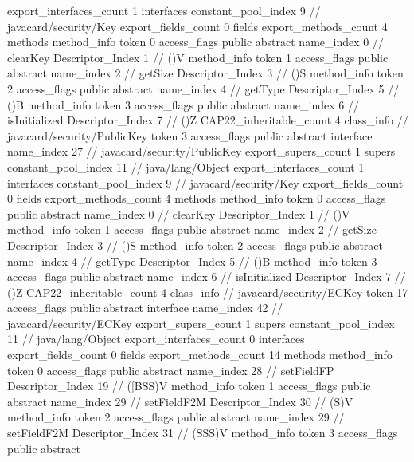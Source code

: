 {{{{			}
			export_interfaces_count	1
			interfaces {
				constant_pool_index	9		// javacard/security/Key
			}
			export_fields_count	0
			fields {
			}
			export_methods_count	4
			methods {
				method_info {
					token	0
					access_flags	public abstract
					name_index	0		// clearKey
					Descriptor_Index	1		// ()V
				}
				method_info {
					token	1
					access_flags	public abstract
					name_index	2		// getSize
					Descriptor_Index	3		// ()S
				}
				method_info {
					token	2
					access_flags	public abstract
					name_index	4		// getType
					Descriptor_Index	5		// ()B
				}
				method_info {
					token	3
					access_flags	public abstract
					name_index	6		// isInitialized
					Descriptor_Index	7		// ()Z
				}
			}
			CAP22_inheritable_count	4
		}
		class_info {		// javacard/security/PublicKey
			token	3
			access_flags	public abstract interface
			name_index	27		// javacard/security/PublicKey
			export_supers_count	1
			supers {
				constant_pool_index	11		// java/lang/Object
			}
			export_interfaces_count	1
			interfaces {
				constant_pool_index	9		// javacard/security/Key
			}
			export_fields_count	0
			fields {
			}
			export_methods_count	4
			methods {
				method_info {
					token	0
					access_flags	public abstract
					name_index	0		// clearKey
					Descriptor_Index	1		// ()V
				}
				method_info {
					token	1
					access_flags	public abstract
					name_index	2		// getSize
					Descriptor_Index	3		// ()S
				}
				method_info {
					token	2
					access_flags	public abstract
					name_index	4		// getType
					Descriptor_Index	5		// ()B
				}
				method_info {
					token	3
					access_flags	public abstract
					name_index	6		// isInitialized
					Descriptor_Index	7		// ()Z
				}
			}
			CAP22_inheritable_count	4
		}
		class_info {		// javacard/security/ECKey
			token	17
			access_flags	public abstract interface
			name_index	42		// javacard/security/ECKey
			export_supers_count	1
			supers {
				constant_pool_index	11		// java/lang/Object
			}
			export_interfaces_count	0
			interfaces {
			}
			export_fields_count	0
			fields {
			}
			export_methods_count	14
			methods {
				method_info {
					token	0
					access_flags	public abstract
					name_index	28		// setFieldFP
					Descriptor_Index	19		// ([BSS)V
				}
				method_info {
					token	1
					access_flags	public abstract
					name_index	29		// setFieldF2M
					Descriptor_Index	30		// (S)V
				}
				method_info {
					token	2
					access_flags	public abstract
					name_index	29		// setFieldF2M
					Descriptor_Index	31		// (SSS)V
				}
				method_info {
					token	3
					access_flags	public abstract
}}}}}
